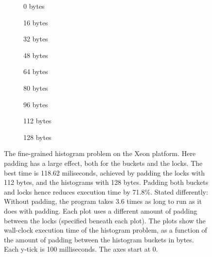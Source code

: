 \begin{figure}[hbpt]
	\graphicspath{{plots/}}
	\begin{subfigure}{0.32\textwidth}
		
		\caption{0 bytes}
	\end{subfigure}
	\begin{subfigure}{0.32\textwidth}
		
		\caption{16 bytes}
	\end{subfigure}
	\begin{subfigure}{0.32\textwidth}
		
		\caption{32 bytes}
	\end{subfigure}
	\begin{subfigure}{0.32\textwidth}
		
		\caption{48 bytes}
	\end{subfigure}
	\begin{subfigure}{0.32\textwidth}
		
		\caption{64 bytes}
	\end{subfigure}
	\begin{subfigure}{0.32\textwidth}
		
		\caption{80 bytes}
	\end{subfigure}
	\begin{subfigure}{0.33\textwidth}
		
		\caption{96 bytes}
	\end{subfigure}
	\begin{subfigure}{0.33\textwidth}
		
		\caption{112 bytes}
	\end{subfigure}
	\begin{subfigure}{0.32\textwidth}
		
		\caption{128 bytes}
	\end{subfigure}
	\caption{The fine-grained histogram problem on the Xeon platform. Here padding has a
	large effect, both for the buckets and the locks. The best time is
	118.62 miliseconds, achieved by padding the locks with 112 bytes, and
	the histograms with 128 bytes.
	Padding both buckets and locks hence reduces execution time by 71.8\%.
	Stated differently: Without padding, the program takes 3.6 times as long to
	run as it does with padding.
	Each plot uses a different amount of padding between the locks
	(specified beneath each plot). The plots show the wall-clock execution
	time of the histogram problem, as a function of the amount of padding
	between the histogram buckets in bytes. Each y-tick is 100 milliseconds.
	The axes start at 0.}
	\label{fig:histo-local-xeon}
\end{figure}
